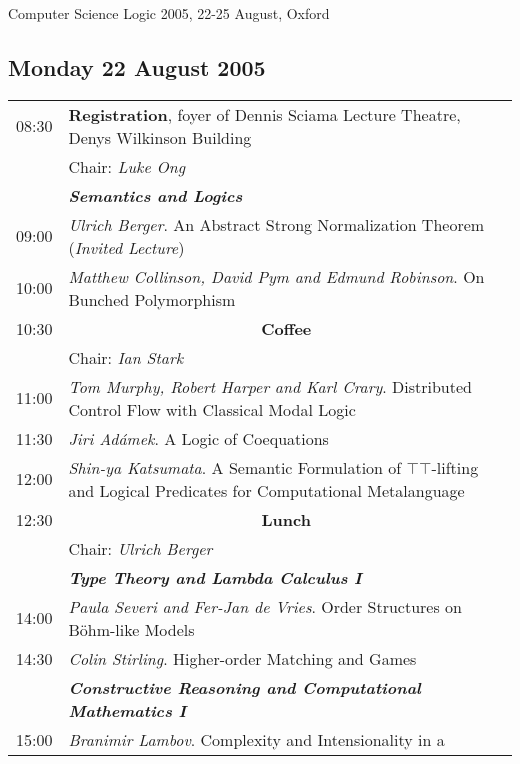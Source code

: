 \documentclass[landscape,12pt]{article}
\newcommand\textbfit[1]{{\bf\em #1}\index{#1}}
\begin{document}
\pagestyle{empty}

\begin{center}
\LARGE\sc Computer Science Logic 2005, 22-25 August, Oxford
\end{center}

\subsection*{Monday 22 August 2005}

\begin{tabular}{p{1cm}p{21cm}}
08:30 & \textbf{Registration}, foyer of Dennis Sciama Lecture Theatre,
Denys Wilkinson Building\\
& Chair: \emph{Luke Ong}\\
&	\textbfit{Semantics and Logics}\\
09:00 &	\emph{Ulrich Berger}. An Abstract Strong Normalization Theorem
(\emph{Invited Lecture})\\
10:00 &	\emph{Matthew Collinson, David Pym and Edmund Robinson}. On Bunched Polymorphism\\
\hline
10:30 & \multicolumn{1}{c}{\textbf{Coffee}}\\
\hline
& Chair: \emph{Ian Stark}\\
11:00 &	\emph{Tom Murphy, Robert Harper and Karl Crary}. Distributed Control Flow with Classical Modal Logic\\
11:30 &	\emph{Jiri Ad\'amek}. A Logic of Coequations\\
12:00 &	\emph{Shin-ya Katsumata}. A Semantic Formulation of $\top\top$-lifting and Logical Predicates for Computational Metalanguage\\
\hline
12:30 & \multicolumn{1}{c}{\bf Lunch}\\
\hline
& Chair: \emph{Ulrich Berger}\\
	& \textbfit{Type Theory and Lambda Calculus I}\\
14:00 & 	\emph{Paula Severi and Fer-Jan de Vries}. Order Structures on B\"ohm-like Models\\
14:30 & 	\emph{Colin Stirling}. Higher-order Matching and Games\\
	& \textbfit{Constructive Reasoning and Computational Mathematics I}\\
15:00 & 	\emph{Branimir Lambov}. Complexity and Intensionality in a

\end{tabular}
\end{document}
